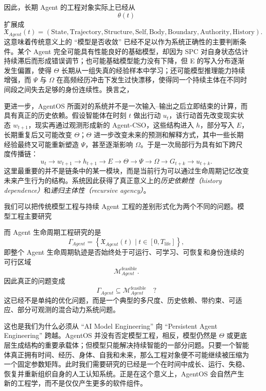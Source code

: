 因此，长期 Agent 的工程对象实际上已经从
\[
\theta(t)
\]
扩展成
\[
\boxed{
\mathfrak{X}_{Agent}(t)
=
\left(
\text{State},
\text{Trajectory},
\text{Structure},
\text{Self},
\text{Body},
\text{Boundary},
\text{Authority},
\text{History}
\right).
}
\]
这意味着传统意义上的 ``模型是否收敛'' 已经不足以作为系统正确性的主要判断条件。某个 Agent 完全可能具有性能良好的基础模型，却因为 SPC 对自身状态估计持续滞后而形成错误调节；也可能基础模型能力没有下降，但 E 的写入分布逐渐发生偏置，使得 $\Theta$ 长期从一组失真的经验样本中学习；还可能模型推理能力持续增强，而 $\Psi$ 与 $\Omega$ 在高频经历冲击下发生过快漂移，使得同一个持续主体在不同时间段之间失去足够的身份连续性。换言之，
\begin{statementbox}
\centering
{}
\end{statementbox}

更进一步，AgentOS 所面对的系统并不是一次输入--输出之后立即结束的计算，而具有真正的历史依赖。假设智能体在时刻 $t$ 做出行动 $u_t$，该行动首先改变现实状态 $w_{t+1}$，现实再通过观测形成新的 Agent-CSO，这些结构进入 $h$，部分写入 $E$，长期重复后又可能改变 $\Theta$；$\Theta$ 进一步改变未来的预测和解释方式，其中一些长期经验最终又可能重新塑造 $\Psi$，甚至逐渐影响 $\Omega$。于是一次局部行为具有如下跨尺度传播链：
\[
u_t
\rightarrow
w_{t+1}
\rightarrow
h_{t+1}
\rightarrow
E
\rightarrow
\Theta
\rightarrow
\Psi
\rightarrow
\Omega
\rightarrow
G_{t+k}
\rightarrow
u_{t+k}.
\]
这里最重要的并不是链条中的某一模块，而是当前行为可以通过生命周期记忆改变未来产生行为的结构。系统因此获得了真正意义上的\emph{历史依赖性（history dependence）}和\emph{递归主体性（recursive agency）}。

我们可以把传统模型工程与持续 Agent 工程的差别形式化为两个不同的问题。模型工程主要研究
\begin{statementbox}
\centering
{}
\end{statementbox}
而 Agent 生命周期工程研究的是
\[
\boxed{
\Gamma_{Agent}
=
\left\{
\mathfrak X_{Agent}(t)
\mid
t\in[0,T_{\mathrm{life}}]
\right\},
}
\]
即整个 Agent 生命周期轨迹是否始终处于可运行、可学习、可恢复和身份连续的可行区域
\[
\mathcal{M}_{Agent}^{\mathrm{feasible}}.
\]
因此真正的问题变成
\[
\Gamma_{Agent}
\subseteq
\mathcal{M}_{Agent}^{\mathrm{feasible}}
\quad ?
\]
这已经不是单纯的优化问题，而是一个典型的多尺度、历史依赖、带约束、可适应、部分可观测的混合动力系统问题。

这也是我们为什么必须从 ``AI Model Engineering'' 向 ``Persistent Agent Engineering'' 跨越。AgentOS 并没有否定模型工程，相反，模型仍然是 $\Theta$ 或更底层生成结构的重要承载体；但模型只能解决持续智能的一部分问题。只要一个智能体真正拥有时间、经历、身体、自我和未来，那么工程对象便不可能继续被压缩为一个固定参数矩阵。此时我们需要研究的已经是一个在时间中成长、运行、失稳、恢复并重新组织自身的人工认知系统。正是在这个意义上，AgentOS 会自然产生新的工程学，而不是仅仅产生更多的软件组件。

